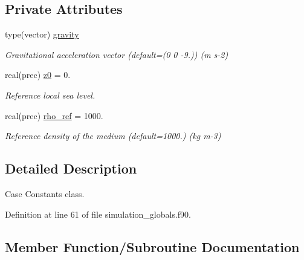 \subsection*{Private Attributes}
\begin{DoxyCompactItemize}
\item 
type(vector) \mbox{\hyperlink{structsimulation__globals__mod_1_1constants__t_ab1d29ee73044e2bb7b47ca302e2cfdf9}{gravity}}
\begin{DoxyCompactList}\small\item\em Gravitational acceleration vector (default=(0 0 -\/9.)) (m s-\/2) \end{DoxyCompactList}\item 
real(prec) \mbox{\hyperlink{structsimulation__globals__mod_1_1constants__t_a737e824cf720aea683fe23939d12aa5b}{z0}} = 0.
\begin{DoxyCompactList}\small\item\em Reference local sea level. \end{DoxyCompactList}\item 
real(prec) \mbox{\hyperlink{structsimulation__globals__mod_1_1constants__t_a7e4a2bb5206340621bfce6792b527f6d}{rho\+\_\+ref}} = 1000.
\begin{DoxyCompactList}\small\item\em Reference density of the medium (default=1000.) (kg m-\/3) \end{DoxyCompactList}\end{DoxyCompactItemize}


\subsection{Detailed Description}
Case Constants class. 

Definition at line 61 of file simulation\+\_\+globals.\+f90.



\subsection{Member Function/\+Subroutine Documentation}
\mbox{\label{structsimulation__globals__mod_1_1constants__t_a920570af3904fb782a96d3765e314468}} 
